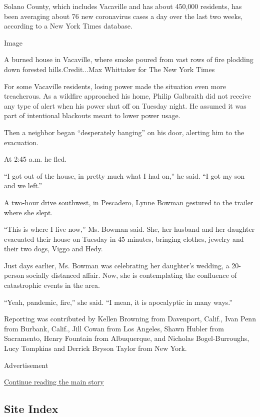 Solano County, which includes Vacaville and has about 450,000 residents,
has been averaging about 76 new coronavirus cases a day over the last
two weeks, according to a New York Times database.

Image

A burned house in Vacaville, where smoke poured from vast rows of fire
plodding down forested hills.Credit...Max Whittaker for The New York
Times

For some Vacaville residents, losing power made the situation even more
treacherous. As a wildfire approached his home, Philip Galbraith did not
receive any type of alert when his power shut off on Tuesday night. He
assumed it was part of intentional blackouts meant to lower power usage.

Then a neighbor began ``desperately banging'' on his door, alerting him
to the evacuation.

At 2:45 a.m. he fled.

``I got out of the house, in pretty much what I had on,'' he said. ``I
got my son and we left.''

A two-hour drive southwest, in Pescadero, Lynne Bowman gestured to the
trailer where she slept.

``This is where I live now,'' Ms. Bowman said. She, her husband and her
daughter evacuated their house on Tuesday in 45 minutes, bringing
clothes, jewelry and their two dogs, Viggo and Hedy.

Just days earlier, Ms. Bowman was celebrating her daughter's wedding, a
20-person socially distanced affair. Now, she is contemplating the
confluence of catastrophic events in the area.

``Yeah, pandemic, fire,'' she said. ``I mean, it is apocalyptic in many
ways.''

Reporting was contributed by Kellen Browning from Davenport, Calif.,
Ivan Penn from Burbank, Calif., Jill Cowan from Los Angeles, Shawn
Hubler from Sacramento, Henry Fountain from Albuquerque, and Nicholas
Bogel-Burroughs, Lucy Tompkins and Derrick Bryson Taylor from New York.

Advertisement

\protect\hyperlink{after-bottom}{Continue reading the main story}

\hypertarget{site-index}{%
\subsection{Site Index}\label{site-index}}


